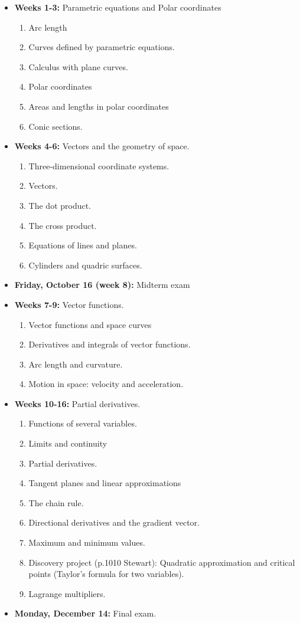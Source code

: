 \documentclass[10pt]{article}
\theoremstyle{definition}
\newcommand{\1}[1]{\textbf{1}_{\left[#1\right]}} %
\begin{document}
\begin{itemize}
  \item \textbf{Weeks 1-3:} Parametric equations and Polar coordinates
  \begin{enumerate}
    \item Arc length
    \item Curves defined by parametric equations.
    \item Calculus with plane curves.
    \item Polar coordinates
    \item Areas and lengths in polar coordinates
    \item Conic sections.
  \end{enumerate}
  \item \textbf{Weeks 4-6:} Vectors and the geometry of space.
  \begin{enumerate}
    \item Three-dimensional coordinate systems.
    \item Vectors.
    \item The dot product.
    \item The cross product.
    \item Equations of lines and planes.
    \item Cylinders and quadric surfaces.
  \end{enumerate}
  \item \textbf{Friday, October 16 (week 8):} Midterm exam

  \item \textbf{Weeks 7-9:} Vector functions.
  \begin{enumerate}
    \item Vector functions and space curves
    \item Derivatives and integrals of vector functions.
    \item Arc length and curvature.
    \item Motion in space: velocity and acceleration.
  \end{enumerate}
  \item \textbf{Weeks 10-16:} Partial derivatives.
  \begin{enumerate}
    \item Functions of several variables.
    \item Limits and continuity
    \item Partial derivatives.
    \item Tangent planes and linear approximations
    \item The chain rule.
    \item Directional derivatives and the gradient vector.
    \item Maximum and minimum values.
    \item Discovery project (p.1010 Stewart): Quadratic approximation and critical
    points (Taylor’s formula for two variables).
    \item Lagrange multipliers.
  \end{enumerate}
  \item \textbf{Monday, December 14:} Final exam.
\end{itemize} 
\end{document}
